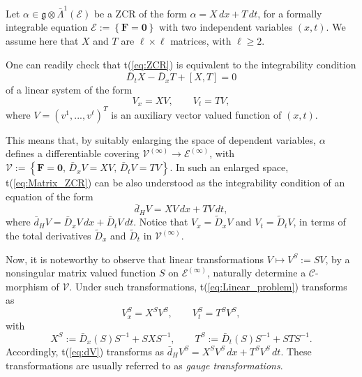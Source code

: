 \documentclass[12pt,english]{elsarticle}
\theoremstyle{plain}
\theoremstyle{plain}
\theoremstyle{remark}
\theoremstyle{plain}
\theoremstyle{definition}
\theoremstyle{definition}
\begin{document}
Let
$\alpha \in \mathfrak{g}\otimes \bar{\Lambda}^{1}\left ({\mathcal{E}}
\right )$ be a ZCR of the form $\alpha =X\,dx+T\,dt$, for a formally integrable
equation $\mathcal{E}:=\left \{ \mathbf{F=0}\right \} $ with two independent
variables $\left (x,t\right )$. We assume here that $X$ and $T$ are
$\ell \times \ell $ matrices, with $\ell \geq 2$.

One can readily check that t{(\ref{eq:ZCR})} is equivalent to the integrability
condition
%
\begin{equation}
\bar{D}_{t}X-\bar{D}_{x}T+\left [X,T\right ]=0
\label{eq:Matrix_ZCR}
\end{equation}
%
of a linear system of the form
%
\begin{equation}
V_{x}=XV,\qquad V_{t}=TV,
\label{eq:Linear_problem}
\end{equation}
%
where $V=(v^{1},...,v^{\ell})^{T}$ is an auxiliary vector valued function
of $(x,t)$.

This means that, by suitably enlarging the space of dependent variables,
$\alpha $ defines a differentiable covering
$\mathcal{V}^{(\infty )}\rightarrow \mathcal{E}^{(\infty )}$, with
$\mathcal{V}:=\left \{ \mathbf{F=0},\,\bar{D}_{x}V=XV,\,\bar{D}_{t}V=TV
\right \} $. In such an enlarged space, t{(\ref{eq:Matrix_ZCR})} can be also
understood as the integrability condition of an equation of the form
%
\begin{equation}
\bar{d}_{H}V=XV\,dx+TV\,dt,
\label{eq:dV}
\end{equation}
%
where $\bar{d}_{H}V=\bar{D}_{x}V\,dx+\bar{D}_{t}V\,dt$. Notice that
$V_{x}=\tilde{D}_{x}V$ and $V_{t}=\tilde{D}_{t}V$, in terms of the total
derivatives $\tilde{D}_{x}$ and $\tilde{D}_{t}$ in
$\mathcal{V}^{(\infty )}$.

Now, it is noteworthy to observe that linear transformations
$V\mapsto V^{S}:=SV$, by a nonsingular matrix valued function $S$ on
$\mathcal{E}^{(\infty )}$, naturally determine a $\mathcal{C}$-morphism
of $\mathcal{V}$. Under such transformations, t{(\ref{eq:Linear_problem})}
transforms as
%
\begin{equation*}
V_{x}^{S}=X^{S}V^{S},\qquad V_{t}^{S}=T^{S}V^{S},
\end{equation*}
%
with
%
\begin{equation*}
X^{S}:=\bar{D}_{x}\left (S\right )S^{-1}+SXS^{-1},\qquad T^{S}:=
\bar{D}_{t}\left (S\right )S^{-1}+STS^{-1}.
\end{equation*}
%
Accordingly, t{(\ref{eq:dV})} transforms as
$\bar{d}_{H}V^{S}=X^{S}V^{S}\,dx+T^{S}V^{S}\,dt$. These transformations
are usually referred to as \textit{gauge transformations}.
\end{document}
